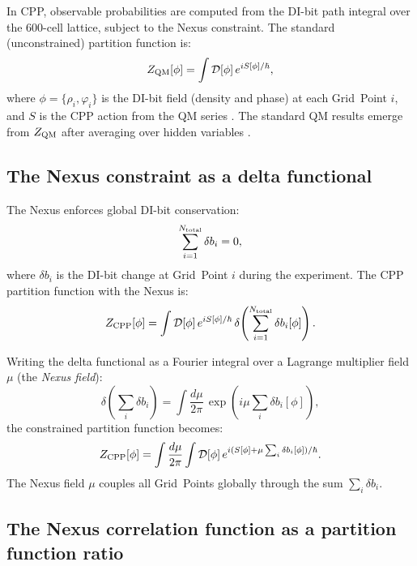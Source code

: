 \documentclass[11pt,a4paper]{article}
\newcommand{\Ntot}{N_{\rm total}}
\begin{document}
In CPP, observable probabilities are computed from the DI-bit path
integral over the 600-cell lattice, subject to the Nexus constraint.
The standard (unconstrained) partition function is:
\begin{equation}
Z_{\rm QM}[\phi]
= \int \mathcal{D}[\phi]\,e^{iS[\phi]/\hbar},
\label{eq:Z_QM}
\end{equation}
where $\phi = \{\rho_i, \varphi_i\}$ is the DI-bit field (density
and phase) at each Grid~Point $i$, and $S$ is the CPP action from
the QM series \citep{cpp_qm_series}.  The standard QM results
emerge from $Z_{\rm QM}$ after averaging over hidden variables
\citep{cpp2040c}.

\subsection{The Nexus constraint as a delta functional}

The Nexus enforces global DI-bit conservation:
\begin{equation}
\sum_{i=1}^{\Ntot} \delta b_i = 0,
\label{eq:nexus_constraint}
\end{equation}
where $\delta b_i$ is the DI-bit change at Grid~Point $i$ during
the experiment.  The CPP partition function with the Nexus is:
\begin{equation}
Z_{\rm CPP}[\phi]
= \int \mathcal{D}[\phi]\,e^{iS[\phi]/\hbar}\,
  \delta\!\left(\sum_{i=1}^{\Ntot}\delta b_i[\phi]\right).
\label{eq:Z_CPP}
\end{equation}

Writing the delta functional as a Fourier integral over a
Lagrange multiplier field $\mu$ (the \emph{Nexus field}):
\begin{equation}
\delta\!\left(\sum_i \delta b_i\right)
= \int \frac{d\mu}{2\pi}\,
  \exp\!\left(i\mu\sum_i \delta b_i[\phi]\right),
\label{eq:delta_fourier}
\end{equation}
the constrained partition function becomes:
\begin{equation}
Z_{\rm CPP}[\phi]
= \int \frac{d\mu}{2\pi}
  \int \mathcal{D}[\phi]\,
  e^{i(S[\phi] + \mu\sum_i\delta b_i[\phi])/\hbar}.
\label{eq:Z_CPP_fourier}
\end{equation}
The Nexus field $\mu$ couples all Grid~Points globally through the
sum $\sum_i \delta b_i$.

\subsection{The Nexus correlation function as a partition function ratio}
\end{document}
